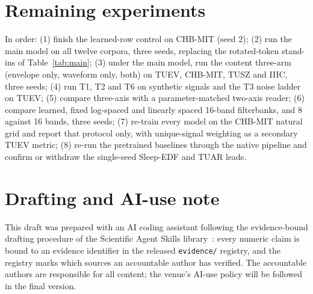 \section{Remaining experiments}
\label{sec:remaining}
In order: (1) finish the learned-row control on CHB-MIT (seed 2); (2) run the main model on all twelve corpora, three seeds, replacing the rotated-token stand-ins of Table~\ref{tab:main}; (3) under the main model, run the content three-arm (envelope only, waveform only, both) on TUEV, CHB-MIT, TUSZ and IIIC, three seeds; (4) run T1, T2 and T6 on synthetic signals and the T3 noise ladder on TUEV; (5) compare three-axis with a parameter-matched two-axis reader; (6) compare learned, fixed log-spaced and linearly spaced 16-band filterbanks, and 8 against 16 bands, three seeds; (7) re-train every model on the CHB-MIT natural grid and report that protocol only, with unique-signal weighting as a secondary TUEV metric; (8) re-run the pretrained baselines through the native pipeline and confirm or withdraw the single-seed Sleep-EDF and TUAR leads.

\section{Drafting and AI-use note}
\label{sec:aiuse}
This draft was prepared with an AI coding assistant following the evidence-bound drafting procedure of the Scientific Agent Skills library~\cite{kassis2026skills}: every numeric claim is bound to an evidence identifier in the released \texttt{evidence/} registry, and the registry marks which sources an accountable author has verified. The accountable authors are responsible for all content; the venue's AI-use policy will be followed in the final version.
